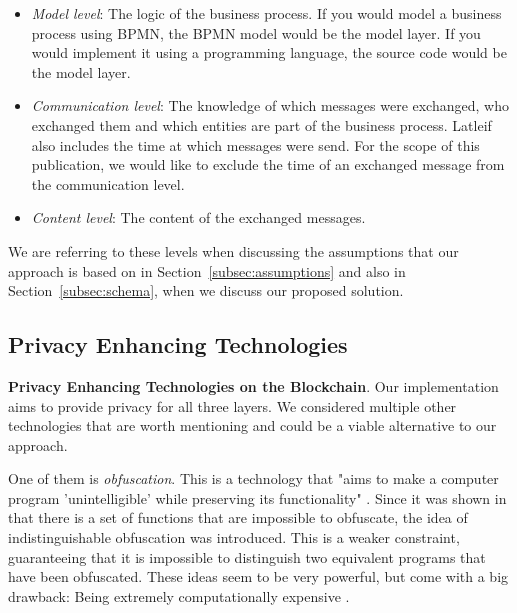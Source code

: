\documentclass[runningheads]{llncs}
\newcommand{\ber}[1]{\textit{#1}}
\newcommand{\refsec}[1]{Section~\ref{#1}}
\begin{document}
\begin{itemize}
    \item \ber{Model level}: The logic of the business process. If you would model a business process using BPMN, the BPMN model would be the model layer. If you would implement it using a programming language, the source code would be the model layer.
    \item \ber{Communication level}: The knowledge of which messages were exchanged, who exchanged them and which entities are part of the business process. Latleif also includes the time at which messages were send. For the scope of this publication, we would like to exclude the time of an exchanged message from the communication level.
    \item \ber{Content level}: The content of the exchanged messages.
\end{itemize}

We are referring to these levels when discussing the assumptions that our approach is based on in \refsec{subsec:assumptions} and also in \refsec{subsec:schema}, when we discuss our proposed solution. 






\subsection{Privacy Enhancing Technologies} \label{subsec:technologies}

\textbf{Privacy Enhancing Technologies on the Blockchain}. Our implementation aims to provide privacy for all three layers. We considered multiple other technologies that are  worth mentioning and could be a viable alternative to our approach. 

One of them is \textit{obfuscation}. This is a technology that "aims to make a computer program 'unintelligible' while preserving its functionality" \cite{garg2016candidate}. Since it was shown in \cite{barak2001possibility,barak2012possibility} that there is a set of functions that are impossible to obfuscate, the idea of indistinguishable obfuscation was introduced. This is a weaker constraint, guaranteeing that it is impossible to distinguish two equivalent programs that have been obfuscated. These ideas seem to be very powerful, but come with a big drawback: Being extremely computationally expensive \cite{banescu2015idea}. 
\end{document}

